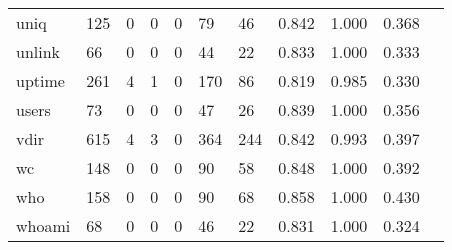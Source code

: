 \begin{longtable}{lp{1.10cm}p{1.10cm}p{1.10cm}p{1.10cm}p{1.10cm}p{1.10cm}p{1.10cm}p{1.10cm}p{1.10cm}p{1.10cm}}
uniq      &                    125 &                                  0 &                                 0 &                                0 &                                79 &                              46 &                          0.842 &                                 1.000 &                               0.368 \\
unlink    &                     66 &                                  0 &                                 0 &                                0 &                                44 &                              22 &                          0.833 &                                 1.000 &                               0.333 \\
uptime    &                    261 &                                  4 &                                 1 &                                0 &                               170 &                              86 &                          0.819 &                                 0.985 &                               0.330 \\
users     &                     73 &                                  0 &                                 0 &                                0 &                                47 &                              26 &                          0.839 &                                 1.000 &                               0.356 \\
vdir      &                    615 &                                  4 &                                 3 &                                0 &                               364 &                             244 &                          0.842 &                                 0.993 &                               0.397 \\
wc        &                    148 &                                  0 &                                 0 &                                0 &                                90 &                              58 &                          0.848 &                                 1.000 &                               0.392 \\
who       &                    158 &                                  0 &                                 0 &                                0 &                                90 &                              68 &                          0.858 &                                 1.000 &                               0.430 \\
whoami    &                     68 &                                  0 &                                 0 &                                0 &                                46 &                              22 &                          0.831 &                                 1.000 &                               0.324 \\

\end{longtable}
